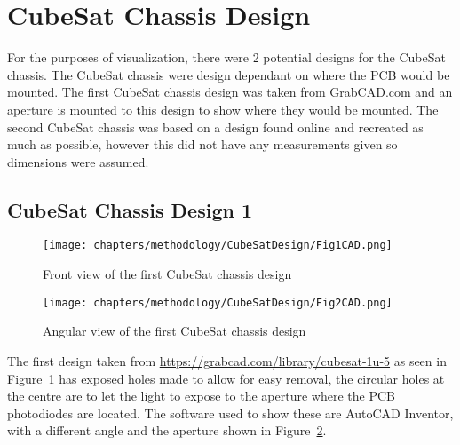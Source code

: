 \section{CubeSat Chassis Design}


For the purposes of visualization, there were 2 potential designs for the CubeSat chassis. 
The CubeSat chassis were design dependant on where the PCB would be mounted. 
The first CubeSat chassis design was taken from GrabCAD.com and an aperture is mounted to this design to show where they would be mounted. 
The second CubeSat chassis was based on a design found online and recreated as much as possible, however this did not have any measurements given so dimensions were assumed.

\subsection{CubeSat Chassis Design 1}

\begin{figure}[htbp]
    \centering
    \texttt{[image: chapters/methodology/CubeSatDesign/Fig1CAD.png]}
    \caption{Front view of the first CubeSat chassis design}
    \label{fig:cubesat-chassis1-front}
    \end{figure}

    \begin{figure}[htbp]
    \centering
    \texttt{[image: chapters/methodology/CubeSatDesign/Fig2CAD.png]}
    \caption{Angular view of the first CubeSat chassis design}
    \label{fig:cubesat-chassis1-angle}
    \end{figure}
The first design taken from \url{https://grabcad.com/library/cubesat-1u-5} as seen in Figure~\ref{fig:cubesat-chassis1-front} has exposed holes made to allow for easy removal, the circular holes at the centre are to let the light to expose to the aperture where the PCB photodiodes are located. 
The software used to show these are AutoCAD Inventor, with a different angle and the aperture shown in Figure~\ref{fig:cubesat-chassis1-angle}.


